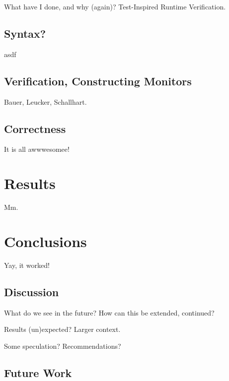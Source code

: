 \documentclass[a4paper,11pt]{kth-mag}
\begin{document}
What have I done, and why (again)? Test-Inspired Runtime Verification.


\section{Syntax?}

asdf

\section{Verification, Constructing Monitors}

Bauer, Leucker, Schallhart.

\section{Correctness}

It is all awwwesomee!





\pagestyle{newchap}
\chapter{Results}

Mm.





\pagestyle{newchap}
\chapter{Conclusions}
Yay, it worked!


\section{Discussion}

What do we see in the future? How can this be extended, continued?

Results (un)expected? Larger context.

Some speculation? Recommendations?

\section{Future Work}
\end{document}

